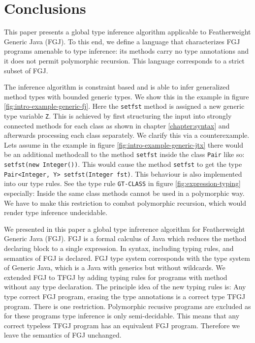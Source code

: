 \section{Conclusions}
\label{sec:conclusions}

This paper presents a global type inference algorithm applicable to
Featherweight Generic Java (FGJ). To this end, we define a language
\FGJGT that characterizes FGJ programs amenable to type inference: its
methods carry no type annotations and it does not permit polymorphic recursion.
This language corresponds to a strict subset of FGJ.

The inference algorithm is constraint based and is able to infer
generalized method types with bounded generic types. 
We show this in the example in figure \ref{fig:intro-example-generic-fj}.
Here the \texttt{setfst} method is assigned a new generic type variable \texttt{Z}.
This is achieved by first structuring the input into strongly connected methods for each class as shown in chapter \ref{chapter:syntax}
and afterwards processing each class separately.
We clarify this via a counterexample.
Lets assume in the example in figure \ref{fig:intro-example-generic-jtx} there would be an additional methodcall to the method \texttt{setfst} inside the class \texttt{Pair} like so:
\texttt{setfst(new Integer())}.
This would cause the method \texttt{setfst} to get the type \texttt{Pair<Integer, Y> setfst(Integer fst)}.
This behaviour is also implemented into our type rules.
See the type rule \texttt{GT-CLASS} in figure \ref{fig:expression-typing} especially:
Inside the same class methods cannot be used in a polymorphic way.
We have to make this restriction to combat polymorphic recursion, which would render type inference undecidable.


We presented in this paper a global type infrerence algorithm for Featherweight
Generic Java (FGJ). FGJ is a formal calculus of Java which reduces the method
declaring block to a single expression. In
\cite{DBLP:journals/toplas/IgarashiPW01} syntax, including typing rules, and semantics of FGJ is
declared. FGJ type system corresponds with the type system of Generic Java, which is a Java with generics but without wildcards. We extended FGJ to TFGJ by adding typing rules for
programs with method without any type declaration. The principle idea of the
new typing rules is: Any type correct FGJ program, erasing the type
annotations is a correct type TFGJ program. There is one
restriction. Polymorphic recusive programs are excluded as for these programs
type inference is only semi-decidable. This means that any correct typeless TFGJ program
has an equivalent FGJ program. Therefore we leave the semantics of FGJ unchanged.

